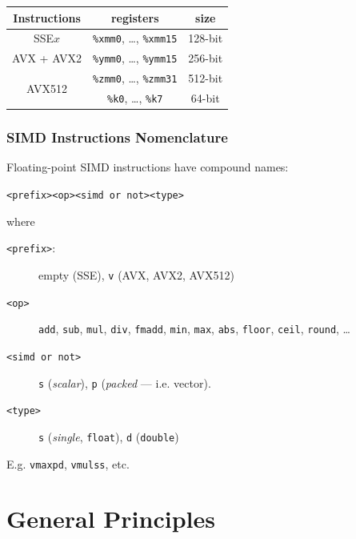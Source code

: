 \documentclass[xcolor={x11names,svgnames}]{beamer}
\newcommand{\red}[1]{{\color{red}#1}}
\begin{document}
\begin{frame}
\begin{center}
\begin{tabular}{|c|c|c|}
  \hline
  Instructions & registers & size \\
  \hline\hline
  SSE$x$              & \texttt{\%xmm0}, \dots, \texttt{\%xmm15} & 128-bit \\
  \hline
  AVX + AVX2          & \texttt{\%ymm0}, \dots, \texttt{\%ymm15} & 256-bit \\
  \hline
  \multirow{2}{*}{AVX512} & \texttt{\%zmm0}, \dots, \texttt{\%zmm31} & 512-bit \\
               & \texttt{\%k0}, \dots, \texttt{\%k7}      & 64-bit \\
  \hline
  \end{tabular}
\end{center}
\end{frame}


\begin{frame}[fragile=singleslide]
  \frametitle{SIMD Instructions Nomenclature}
  
\red{Floating-point} SIMD instructions have compound names:
\begin{center}
  \verb|<prefix><op><simd or not><type>|
\end{center}
where
\begin{description}
\item[\texttt{<prefix>}:] empty (SSE), \texttt{v} (AVX, AVX2, AVX512)
\item[\texttt{<op>}] \texttt{add}, \texttt{sub}, \texttt{mul}, \texttt{div}, \texttt{fmadd}, \texttt{min}, \texttt{max}, \texttt{abs}, \texttt{floor}, \texttt{ceil}, \texttt{round}, \dots
\item[\texttt{<simd or not>}] \texttt{s} (\textit{scalar}), \texttt{p} (\textit{packed} --- i.e. vector).
\item[\texttt{<type>}] \texttt{s} (\textit{single}, \texttt{float}), \texttt{d} (\texttt{double})
\end{description}

\bigskip

E.g. \texttt{vmaxpd}, \texttt{vmulss}, etc.

\end{frame}


\section{General Principles}
\end{document}
